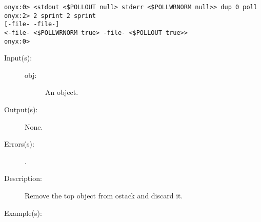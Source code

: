 \begin{description}
\begin{description}
\begin{verbatim}
onyx:0> <stdout <$POLLOUT null> stderr <$POLLWRNORM null>> dup 0 poll
onyx:2> 2 sprint 2 sprint
[-file- -file-]
<-file- <$POLLWRNORM true> -file- <$POLLOUT true>>
onyx:0>
		\end{verbatim}
	\end{description}
\label{systemdict:pop}
\item[{\onyxop{obj}{pop}{--}}: ]
	\begin{description}\item[]
	\item[Input(s): ]
		\begin{description}\item[]
		\item[obj: ]
			An object.
		\end{description}
	\item[Output(s): ] None.
	\item[Errors(s): ]
		\begin{description}\item[]
		\item[.]
		\end{description}
	\item[Description: ]
		Remove the top object from ostack and discard it.
	\item[Example(s): ]\begin{verbatim}


\end{verbatim}
\end{description}
\end{description}

